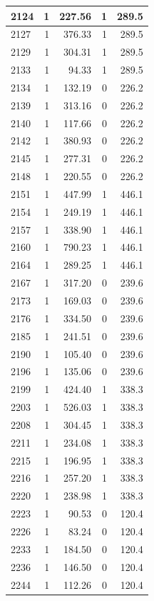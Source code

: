 \documentclass[
  12pt,
]{book}
\begin{document}
\begin{tabular}{l|r|r|r|r}
\hline
2124 & 1 & 227.56 & 1 & 289.5\\
\hline
2127 & 1 & 376.33 & 1 & 289.5\\
\hline
2129 & 1 & 304.31 & 1 & 289.5\\
\hline
2133 & 1 & 94.33 & 1 & 289.5\\
\hline
2134 & 1 & 132.19 & 0 & 226.2\\
\hline
2139 & 1 & 313.16 & 0 & 226.2\\
\hline
2140 & 1 & 117.66 & 0 & 226.2\\
\hline
2142 & 1 & 380.93 & 0 & 226.2\\
\hline
2145 & 1 & 277.31 & 0 & 226.2\\
\hline
2148 & 1 & 220.55 & 0 & 226.2\\
\hline
2151 & 1 & 447.99 & 1 & 446.1\\
\hline
2154 & 1 & 249.19 & 1 & 446.1\\
\hline
2157 & 1 & 338.90 & 1 & 446.1\\
\hline
2160 & 1 & 790.23 & 1 & 446.1\\
\hline
2164 & 1 & 289.25 & 1 & 446.1\\
\hline
2167 & 1 & 317.20 & 0 & 239.6\\
\hline
2173 & 1 & 169.03 & 0 & 239.6\\
\hline
2176 & 1 & 334.50 & 0 & 239.6\\
\hline
2185 & 1 & 241.51 & 0 & 239.6\\
\hline
2190 & 1 & 105.40 & 0 & 239.6\\
\hline
2196 & 1 & 135.06 & 0 & 239.6\\
\hline
2199 & 1 & 424.40 & 1 & 338.3\\
\hline
2203 & 1 & 526.03 & 1 & 338.3\\
\hline
2208 & 1 & 304.45 & 1 & 338.3\\
\hline
2211 & 1 & 234.08 & 1 & 338.3\\
\hline
2215 & 1 & 196.95 & 1 & 338.3\\
\hline
2216 & 1 & 257.20 & 1 & 338.3\\
\hline
2220 & 1 & 238.98 & 1 & 338.3\\
\hline
2223 & 1 & 90.53 & 0 & 120.4\\
\hline
2226 & 1 & 83.24 & 0 & 120.4\\
\hline
2233 & 1 & 184.50 & 0 & 120.4\\
\hline
2236 & 1 & 146.50 & 0 & 120.4\\
\hline
2244 & 1 & 112.26 & 0 & 120.4\\

\end{tabular}
\end{document}
